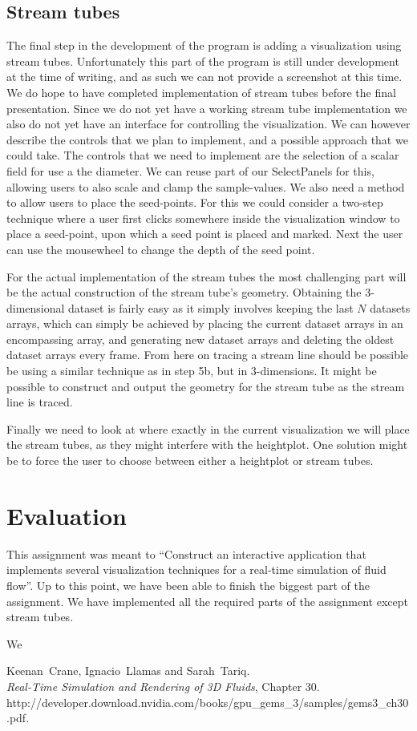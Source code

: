 \documentclass[a4paper,11pt,twoside]{report}
\begin{document}
	\section{Stream tubes}
		The final step in the development of the program is adding a visualization using stream tubes. Unfortunately this part of the program is still under development at the time of writing, and as such we can not provide a screenshot at this time. We do hope to have completed implementation of stream tubes before the final presentation.
		Since we do not yet have a working stream tube implementation we also do not yet have an interface for controlling the visualization. We can however describe the controls that we plan to implement, and a possible approach that we could take. The controls that we need to implement are the selection of a scalar field for use a the diameter. We can reuse part of our SelectPanels for this, allowing users to also scale and clamp the sample-values. We also need a method to allow users to place the seed-points. For this we could consider a two-step technique where a user first clicks somewhere inside the visualization window to place a seed-point, upon which a seed point is placed and marked. Next the user can use the mousewheel to change the depth of the seed point.

		For the actual implementation of the stream tubes the most challenging part will be the actual construction of the stream tube's geometry. Obtaining the 3-dimensional dataset is fairly easy as it simply involves keeping the last $N$ datasets arrays, which can simply be achieved by placing the current dataset arrays in an encompassing array, and generating new dataset arrays and deleting the oldest dataset arrays every frame. From here on tracing a stream line should be possible be using a similar technique as in step 5b, but in 3-dimensions. It might be possible to construct and output the geometry for the stream tube as the stream line is traced.

		Finally we need to look at where exactly in the current visualization we will place the stream tubes, as they might interfere with the heightplot. One solution might be to force the user to choose between either a heightplot or stream tubes.
\chapter{Evaluation}
    This assignment was meant to ``Construct an interactive application that implements several visualization techniques for a real-time simulation of fluid flow''. Up to this point, we have been able to finish the biggest part of the assignment. We have implemented all the required parts of the assignment except stream tubes.

    We
\begin{thebibliography}{99}
 Keenan~Crane, Ignacio~Llamas and Sarah~Tariq.\\
        \textit{Real-Time Simulation and Rendering of 3D Fluids}, Chapter 30.\\
        http://developer.download.nvidia.com/books/gpu\_gems\_3/samples/gems3\_ch30.pdf.\\
\end{thebibliography}
\end{document}
